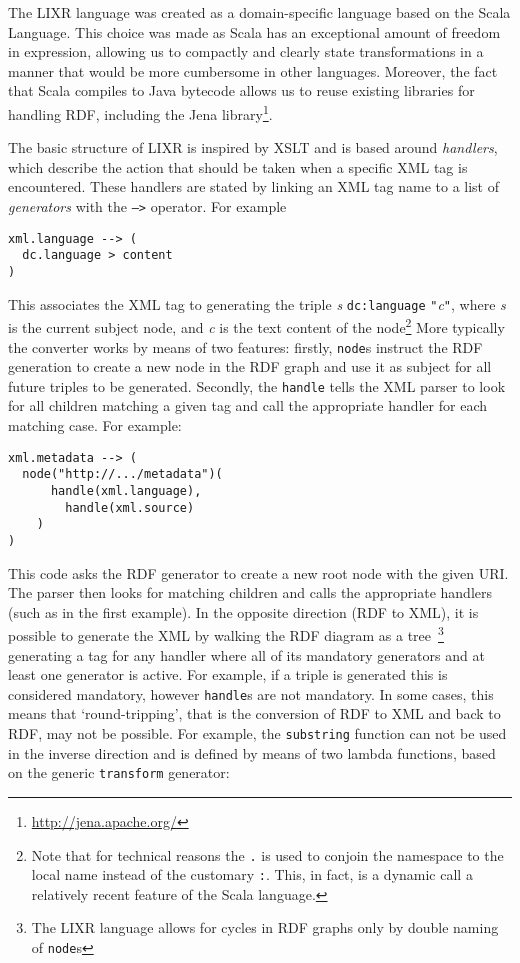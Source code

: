 \documentclass{acm_proc_article-sp}
\begin{document}
The LIXR language was created as a domain-specific language based on the Scala
Language. This choice was made as Scala has an exceptional amount of freedom in
expression, allowing us to compactly and clearly state transformations in a manner
that would be more cumbersome in other languages. Moreover, the fact that Scala
compiles to Java bytecode allows us to reuse existing libraries for handling
RDF, including the Jena library\footnote{\url{http://jena.apache.org/}}.

The basic structure of LIXR is inspired by XSLT and is based around \emph{handlers},
which describe the action that should be taken when a specific XML tag is 
encountered. These handlers are stated by linking an XML tag name to a list
of \emph{generators} with the {\tt -->} operator. For example

\begin{verbatim}
xml.language --> (
  dc.language > content
)
\end{verbatim}

This associates the XML tag {\tt <xml:language>} to
generating the triple \emph{s} {\tt dc:language} {\tt "}\emph{c}{\tt "}, 
where \emph{s} is the current subject node, and \emph{c} is the text content of
the node\footnote{Note that for technical reasons the {\tt .} is used to conjoin the namespace
to the local name instead of the customary {\tt :}. This, in fact, is 
a dynamic call a relatively recent feature of the Scala language.} More typically
the converter works by means of two features: firstly, {\tt node}s instruct the RDF generation
to create a new node in the RDF graph and use it as subject for all future triples
to be generated. Secondly, the {\tt handle} tells the XML parser to look for all 
children matching a given tag and call the appropriate handler for each matching
case. For example:

\begin{verbatim}
xml.metadata --> (
  node("http://.../metadata")(
	  handle(xml.language),
		handle(xml.source)
	)
)
\end{verbatim}

This code asks the RDF generator to create a new root node with the given URI. The parser
then looks for matching children and calls the appropriate handlers
(such as in the first example). In the opposite direction (RDF to XML), it is
possible to generate the XML by walking the RDF diagram as a tree~\footnote{
The LIXR language allows for cycles in RDF graphs only by double naming of
{\tt node}s} generating a
tag for any handler where all of its mandatory generators and at least one 
generator is active. For example, if a triple is generated this is considered
mandatory, however {\tt handle}s are not mandatory. In some cases, this means that
`round-tripping', that is the conversion of RDF to XML and back to RDF, may not
be possible. For example, the {\tt substring} function can not be used in the
inverse direction and is defined by means of two lambda functions, based on
the generic {\tt transform} generator:
\end{document}
